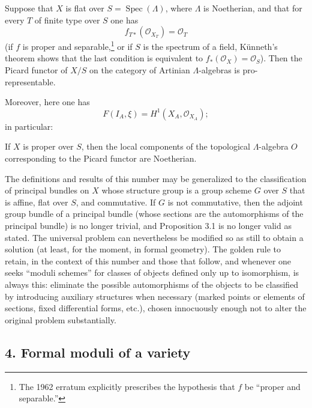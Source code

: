  Suppose that $X$ is flat over
$S=\operatorname{Spec}(\Lambda)$, where $\Lambda$ is Noetherian, and that for
every $T$ of finite type over $S$ one has
\[
  f_{T*}(\mathcal O_{X_T})=\mathcal O_T
\]
(if $f$ is proper and separable,\footnote{The 1962 erratum explicitly prescribes
the hypothesis that $f$ be “proper and separable.”} or if $S$ is the spectrum
of a field, Künneth's theorem shows that the last condition is equivalent to
$f_*(\mathcal O_X)=\mathcal O_S$). Then the Picard functor of $X/S$ on the
category of Artinian $\Lambda$-algebras is pro-representable.

Moreover, here one has
\[
  F(I_A,\xi)=H^1(X_A,\mathcal O_{X_A});
\]
in particular:

 If $X$ is proper over $S$, then the local components of
the topological $\Lambda$-algebra $O$ corresponding to the Picard functor are
Noetherian.

 The definitions and results of this number may be
generalized to the classification of principal bundles on $X$ whose structure
group is a group scheme $G$ over $S$ that is affine, flat over $S$, and
commutative. If $G$ is not commutative, then the adjoint group bundle of a
principal bundle (whose sections are the automorphisms of the principal
bundle) is no longer trivial, and Proposition 3.1 is no longer valid as stated.
The universal problem can nevertheless be modified so as still to obtain a
solution (at least, for the moment, in formal geometry). The golden rule to
retain, in the context of this number and those that follow, and whenever one
seeks “moduli schemes” for classes of objects defined only up to isomorphism,
is always this: eliminate the possible automorphisms of the objects to be
classified by introducing auxiliary structures when necessary (marked points
or elements of sections, fixed differential forms, etc.), chosen innocuously
enough not to alter the original problem substantially.

\subsection*{4. Formal moduli of a variety}

